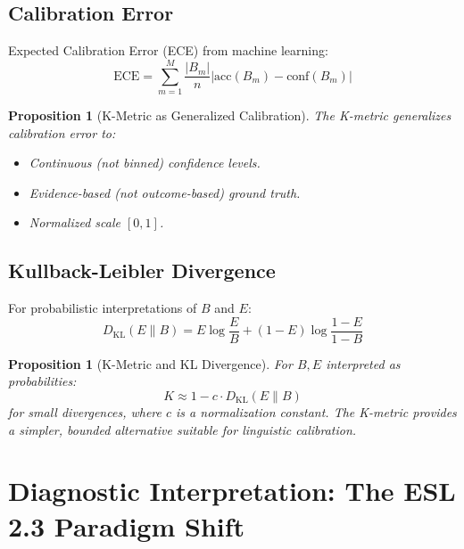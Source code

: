 \documentclass[11pt,a4paper]{article}
\newtheorem{proposition}[theorem]{Proposition}
\theoremstyle{remark}
\begin{document}
\subsection{Calibration Error}

Expected Calibration Error (ECE) from machine learning:
\begin{equation}
\text{ECE} = \sum_{m=1}^{M} \frac{|B_m|}{n} |\text{acc}(B_m) - \text{conf}(B_m)|
\end{equation}

\begin{proposition}[K-Metric as Generalized Calibration]
\label{prop:ece}
The K-metric generalizes calibration error to:
\begin{itemize}
    \item Continuous (not binned) confidence levels.
    \item Evidence-based (not outcome-based) ground truth.
    \item Normalized scale $[0, 1]$.
\end{itemize}
\end{proposition}

\subsection{Kullback-Leibler Divergence}

For probabilistic interpretations of $B$ and $E$:
\begin{equation}
D_{\text{KL}}(E \| B) = E \log \frac{E}{B} + (1-E) \log \frac{1-E}{1-B}
\end{equation}

\begin{proposition}[K-Metric and KL Divergence]
\label{prop:kl}
For $B, E$ interpreted as probabilities:
\begin{equation}
K \approx 1 - c \cdot D_{\text{KL}}(E \| B)
\end{equation}
for small divergences, where $c$ is a normalization constant. The K-metric provides a simpler, bounded alternative suitable for linguistic calibration.
\end{proposition}


\section{Diagnostic Interpretation: The ESL 2.3 Paradigm Shift}
\label{sec:diagnostic}
\end{document}
